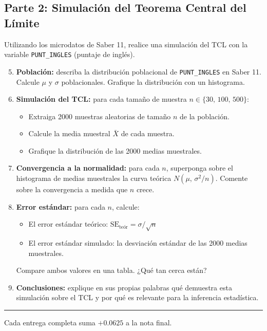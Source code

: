 \documentclass[11pt, a4paper]{article}
\begin{document}
\subsection*{Parte 2: Simulaci\'on del Teorema Central del L\'imite}

Utilizando los microdatos de Saber 11, realice una simulaci\'on del TCL con la
variable \texttt{PUNT\_INGLES} (puntaje de ingl\'es).

\begin{enumerate}[label=\alph*), resume]
  \setcounter{enumi}{4}
  \item \textbf{Poblaci\'on:} describa la distribuci\'on poblacional de
        \texttt{PUNT\_INGLES} en Saber 11. Calcule $\mu$ y $\sigma$ poblacionales.
        Grafique la distribuci\'on con un histograma.

  \item \textbf{Simulaci\'on del TCL:} para cada tama\~no de muestra
        $n \in \{30,\, 100,\, 500\}$:
        \begin{itemize}
          \item Extraiga 2000 muestras aleatorias de tama\~no $n$ de la poblaci\'on.
          \item Calcule la media muestral $\bar{X}$ de cada muestra.
          \item Grafique la distribuci\'on de las 2000 medias muestrales.
        \end{itemize}

  \item \textbf{Convergencia a la normalidad:} para cada $n$, superponga sobre el
        histograma de medias muestrales la curva te\'orica
        $N\!\left(\mu,\, \sigma^2/n\right)$.
        Comente sobre la convergencia a medida que $n$ crece.

  \item \textbf{Error est\'andar:} para cada $n$, calcule:
        \begin{itemize}
          \item El error est\'andar te\'orico: $\text{SE}_{\text{te\'or}} = \sigma / \sqrt{n}$
          \item El error est\'andar simulado: la desviaci\'on est\'andar de las 2000 medias
                muestrales.
        \end{itemize}
        Compare ambos valores en una tabla. ¿Qu\'e tan cerca est\'an?

  \item \textbf{Conclusiones:} explique en sus propias palabras qu\'e demuestra
        esta simulaci\'on sobre el TCL y por qu\'e es relevante para la inferencia
        estad\'istica.
\end{enumerate}

\vspace{10pt}
\rule{\linewidth}{0.4pt}
\begin{center}
{\small Cada entrega completa suma $+0.0625$ a la nota final.}
\end{center}
\end{document}
